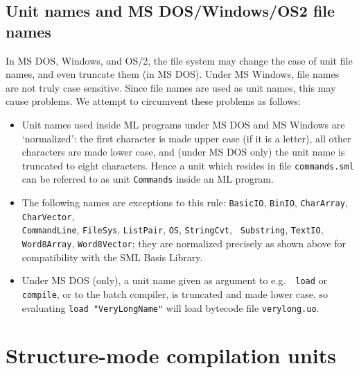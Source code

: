 \documentclass[fleqn,a4paper]{article}
\begin{document}
\subsection{Unit names and MS DOS/Windows/OS2 file names}

In MS DOS, Windows, and OS/2, the file system may change the case of
unit file names, and even truncate them (in MS DOS)\@.  Under MS
Windows, file names are not truly case sensitive.  Since file names
are used as unit names, this may cause problems.  We attempt to
circumvent these problems as follows:

\begin{itemize}
\item Unit names used inside ML programs under MS DOS and MS Windows
  are `normalized': the first character is made upper case (if it is a
  letter), all other characters are made lower case, and (under MS DOS
  only) the unit name is truncated to eight characters.  Hence a unit
  which resides in file {\tt commands.sml} can be referred to as unit
  {\tt Commands} inside an ML program.
  
\item The following names are exceptions to this rule: {\tt BasicIO},
  {\tt BinIO}, {\tt CharArray}, {\tt CharVector},\\ {\tt CommandLine},
  {\tt FileSys}, {\tt ListPair}, {\tt OS}, {\tt StringCvt}, {\tt
    Substring}, {\tt TextIO}, {\tt Word8Array}, {\tt Word8Vector};
  they are normalized precisely as shown above for compatibility with
  the SML Basis Library.

  
\item Under MS DOS (only), a unit name given as argument to e.g.\ {\tt
    load} or {\tt compile}, or to the batch compiler, is truncated and
  made lower case, so evaluating {\tt load "VeryLongName"} will load
  bytecode file {\tt verylong.uo}.
\end{itemize}


\newpage

\section{Structure-mode compilation units}
\label{sec-structure-mode}
\end{document}
